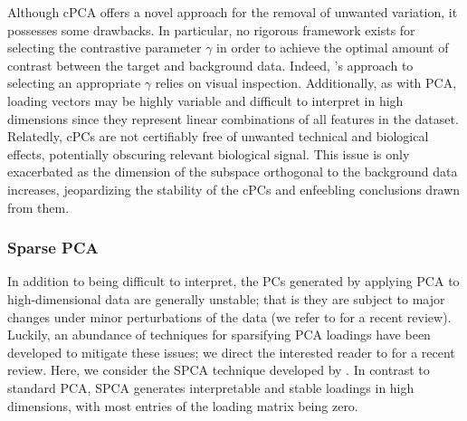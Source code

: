 Although cPCA offers a novel approach for the removal of unwanted variation, it possesses some drawbacks. In particular, no rigorous framework exists for selecting the contrastive parameter $\gamma$ in order to achieve the optimal amount of contrast between the target and background data. Indeed, \citet{Abid2018}'s  approach to selecting an appropriate $\gamma$ relies on visual inspection.  Additionally, as with PCA, loading vectors may be highly variable and difficult to interpret in high dimensions since they represent linear combinations of all features in the dataset. Relatedly, cPCs are not certifiably free of unwanted technical and biological effects, potentially obscuring relevant biological signal.  This issue is only exacerbated as the dimension of the subspace orthogonal to the background data increases, jeopardizing the stability of the cPCs and enfeebling conclusions drawn from them. 

\subsubsection{Sparse PCA}\label{spca}

In addition to being difficult to interpret, the PCs generated by applying PCA to high-dimensional data are generally unstable; that is they are
subject to major changes under minor perturbations of the data 
(we refer to \citet{johnstone2018pca} for a recent review). Luckily, an abundance of techniques for sparsifying PCA loadings have been developed to mitigate these issues; we direct the interested reader to \citet{ZouReview2018} for a recent review. Here, we consider the SPCA technique developed by \citet{Zou2006}. In contrast to standard PCA, SPCA generates interpretable and stable loadings in high dimensions, with most entries of the loading matrix being zero.

